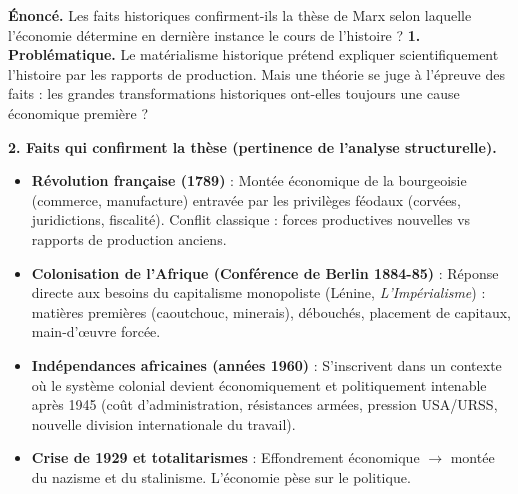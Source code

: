 \documentclass[11pt]{article}
\begin{document}
\begin{exoresolu}
\textbf{Énoncé.} Les faits historiques confirment-ils la thèse de Marx selon laquelle l'économie détermine en dernière instance le cours de l'histoire ?
\tcblower
\textbf{1. Problématique.} Le matérialisme historique prétend expliquer scientifiquement l'histoire par les rapports de production. Mais une théorie se juge à l'épreuve des faits : les grandes transformations historiques ont-elles toujours une cause économique première ?

\textbf{2. Faits qui confirment la thèse (pertinence de l'analyse structurelle).}
\begin{itemize}
\item \textbf{Révolution française (1789)} : Montée économique de la bourgeoisie (commerce, manufacture) entravée par les privilèges féodaux (corvées, juridictions, fiscalité). Conflit classique : forces productives nouvelles vs rapports de production anciens.
\item \textbf{Colonisation de l'Afrique (Conférence de Berlin 1884-85)} : Réponse directe aux besoins du capitalisme monopoliste (Lénine, \emph{L'Impérialisme}) : matières premières (caoutchouc, minerais), débouchés, placement de capitaux, main-d'œuvre forcée.
\item \textbf{Indépendances africaines (années 1960)} : S'inscrivent dans un contexte où le système colonial devient économiquement et politiquement intenable après 1945 (coût d'administration, résistances armées, pression USA/URSS, nouvelle division internationale du travail).
\item \textbf{Crise de 1929 et totalitarismes} : Effondrement économique $\rightarrow$ montée du nazisme et du stalinisme. L'économie pèse sur le politique.
\end{itemize}


\end{exoresolu}
\end{document}
